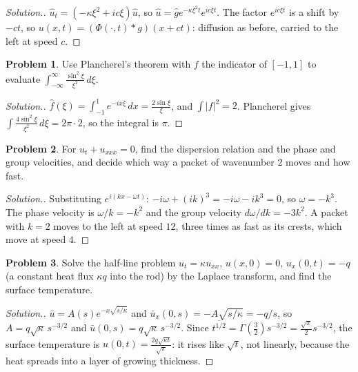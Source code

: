 \documentclass[11pt,a4paper]{article}
\numberwithin{equation}{section}
\theoremstyle{definition}
\newtheorem{problemx}{Problem}[subsection]
\newenvironment{problem}{\begin{problemx}}{\end{problemx}}
\newenvironment{solution}
  {\renewcommand{\qedsymbol}{}\begin{proof}[\textit{Solution}.]}
  {\end{proof}}
\begin{document}
\begin{solution}
$\hat u_t = (-\kappa\xi^2 + ic\xi)\hat u$, so $\hat u = \hat ge^{-\kappa\xi^2t}e^{ic\xi t}$. The factor $e^{ic\xi t}$ is a shift by $-ct$, so $u(x, t) = (\Phi(\cdot, t) * g)(x + ct)$: diffusion as before, carried to the left at speed $c$.
\end{solution}

\begin{problem}
Use Plancherel's theorem with $f$ the indicator of $[-1, 1]$ to evaluate $\int_{-\infty}^\infty\frac{\sin^2\xi}{\xi^2}\,d\xi$.
\end{problem}

\begin{solution}
$\hat f(\xi) = \int_{-1}^1e^{-ix\xi}\,dx = \frac{2\sin\xi}\xi$, and $\int|f|^2 = 2$. Plancherel gives $\int\frac{4\sin^2\xi}{\xi^2}\,d\xi = 2\pi\cdot 2$, so the integral is $\pi$.
\end{solution}

\begin{problem}
For $u_t + u_{xxx} = 0$, find the dispersion relation and the phase and group velocities, and decide which way a packet of wavenumber $2$ moves and how fast.
\end{problem}

\begin{solution}
Substituting $e^{i(kx - \omega t)}$: $-i\omega + (ik)^3 = -i\omega - ik^3 = 0$, so $\omega = -k^3$. The phase velocity is $\omega/k = -k^2$ and the group velocity $d\omega/dk = -3k^2$. A packet with $k = 2$ moves to the left at speed $12$, three times as fast as its crests, which move at speed $4$.
\end{solution}

\begin{problem}
Solve the half-line problem $u_t = \kappa u_{xx}$, $u(x, 0) = 0$, $u_x(0, t) = -q$ (a constant heat flux $\kappa q$ into the rod) by the Laplace transform, and find the surface temperature.
\end{problem}

\begin{solution}
$\bar u = A(s)e^{-x\sqrt{s/\kappa}}$ and $\bar u_x(0, s) = -A\sqrt{s/\kappa} = -q/s$, so $A = q\sqrt\kappa\,s^{-3/2}$ and $\bar u(0, s) = q\sqrt\kappa\,s^{-3/2}$. Since $\overline{t^{1/2}} = \Gamma(\frac32)s^{-3/2} = \frac{\sqrt\pi}2s^{-3/2}$, the surface temperature is
$u(0, t) = \frac{2q\sqrt{\kappa t}}{\sqrt\pi}$: it rises like $\sqrt t$, not linearly, because the heat spreads into a layer of growing thickness.
\end{solution}
\end{document}
